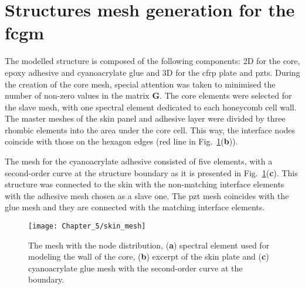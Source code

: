 \section{Structures mesh generation for the \acs{fcgm}}
\label{sec:honeycomb}

The modelled structure is composed of the following components: 2D for the core, epoxy adhesive and cyanoacrylate glue and 3D for the \ac{cfrp} plate and \acp{pzt}.
During the creation of the core mesh, special attention was taken to minimised the number of non-zero values in the matrix \(\textbf{G}\).
The core elements were selected for the slave mesh, with one spectral element dedicated to each honeycomb cell wall.
The master meshes of the skin panel and adhesive layer were divided by three rhombic elements into the area under the core cell.
This way, the interface nodes coincide with those on the hexagon edges (red line in Fig.~\ref{fig:skin_mesh}(\textbf{b})).

The mesh for the cyanoacrylate adhesive consisted of five elements, with a second-order curve at the structure boundary as it is presented in Fig.~\ref{fig:skin_mesh}(\textbf{c}).
This structure was connected to the skin with the non-matching interface elements with the adhesive mesh chosen as a slave one.
The \ac{pzt} mesh coincides with the glue mesh and they are connected with the matching interface elements.
\begin{figure}[H]
	\begin{center}
		\texttt{[image: Chapter\_5/skin\_mesh]}
	\end{center}
	\caption{The mesh with the node distribution, (\textbf{a}) spectral element used for modeling the wall of the core, (\textbf{b}) excerpt of the skin plate and (\textbf{c}) cyanoacrylate glue mesh with the second-order curve at the boundary.}
	\label{fig:skin_mesh}
\end{figure}

